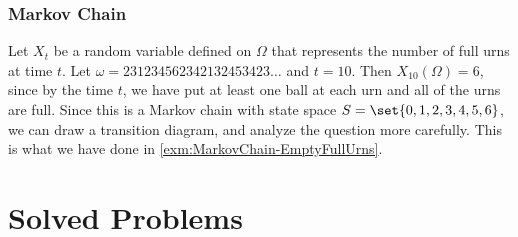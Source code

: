 \subsubsection{Markov Chain}
Let $ X_t $ be a random variable defined on $ \Omega $ that represents the number of full urns at time $ t $. Let $ \omega = 231234562342132453423\hdots $ and $ t = 10 $. Then $ X_10(\Omega) = 6 $, since by the time $ t $, we have put at least one ball at each urn and all of the urns are full. Since this is a Markov chain with state space $ S = \set{0,1,2,3,4,5,6} $, we can draw a transition diagram, and analyze the question more carefully. This is what we have done in \autoref{exm:MarkovChain-EmptyFullUrns}.

\section{Solved Problems}


